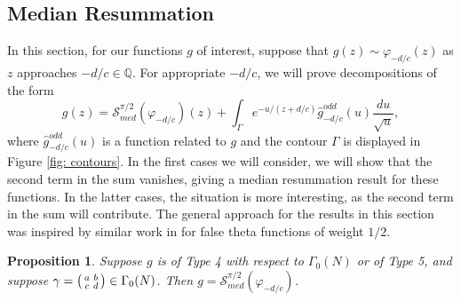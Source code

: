 \documentclass[12pt]{amsart}
\theoremstyle{definition}
\theoremstyle{plain}
\newtheorem{prop}[theorem]{Proposition}
\numberwithin{equation}{section}
\begin{document}
\subsection{Median Resummation} \label{subsec: median resum}



In this section, for our functions $g$ of interest, suppose that $g(z) \sim \varphi_{-d/c}(z)$ as $z$ approaches $-d/c \in \mathbb{Q}$. For appropriate $-d/c$, we will prove decompositions of the form 
\begin{equation}\label{eqn: decomp integral}
g(z)
=  \mathcal{S}^{\pi/2}_{med}(\varphi_{-d/c})(z) 
+  \int_{\Gamma}e^{-u/(z+d/c)}\widehat{g}_{-d/c}^{odd}(u)\frac{du}{\sqrt{u}},
\end{equation}
where $\widehat{g}_{-d/c}^{odd}(u)$ is a function related to $g$ and the contour $\Gamma$ is displayed in Figure \ref{fig: contours}. In the first cases we will consider, we will show that the second term in the sum vanishes, giving a median resummation result for these functions. In the latter cases, the situation is more interesting, as the second term in the sum will contribute. The general approach for the results in this section was inspired by similar work in \cite{gukov-marino-putrov, andersen-mistegard} for false theta functions of weight $1/2$.


\begin{prop}\label{prop: med resum} Suppose $g$ is of Type 4 with respect to $\Gamma_0(N)$ or of Type 5, and suppose $\gamma = \begin{psmallmatrix} a & b \\ c & d\end{psmallmatrix} \in \Gamma_0(N)$. Then $g= \mathcal{S}_{med}^{\pi/2}(\varphi_{-d/c})$.	
\end{prop}
\end{document}
